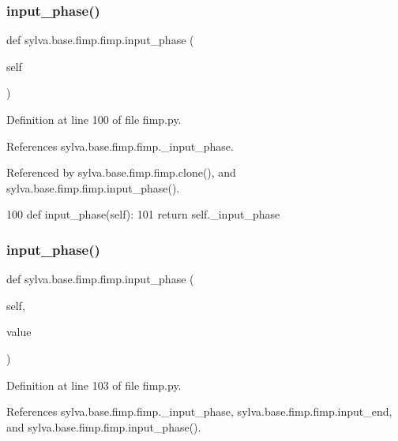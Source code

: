 \subsubsection{\texorpdfstring{input\+\_\+phase()}{input\_phase()}\hspace{0.1cm}{\footnotesize\ttfamily [1/2]}}
{\footnotesize\ttfamily def sylva.\+base.\+fimp.\+fimp.\+input\+\_\+phase (\begin{DoxyParamCaption}\item[{}]{self }\end{DoxyParamCaption})}



Definition at line 100 of file fimp.\+py.



References sylva.\+base.\+fimp.\+fimp.\+\_\+input\+\_\+phase.



Referenced by sylva.\+base.\+fimp.\+fimp.\+clone(), and sylva.\+base.\+fimp.\+fimp.\+input\+\_\+phase().


\begin{DoxyCode}
100     \textcolor{keyword}{def }input\_phase(self):
101         \textcolor{keywordflow}{return} self.\_input\_phase
\end{DoxyCode}
\mbox{\label{classsylva_1_1base_1_1fimp_1_1fimp_a5c9f966e5bc0ac0f2da666d53caae1ac}} 
\subsubsection{\texorpdfstring{input\+\_\+phase()}{input\_phase()}\hspace{0.1cm}{\footnotesize\ttfamily [2/2]}}
{\footnotesize\ttfamily def sylva.\+base.\+fimp.\+fimp.\+input\+\_\+phase (\begin{DoxyParamCaption}\item[{}]{self,  }\item[{}]{value }\end{DoxyParamCaption})}



Definition at line 103 of file fimp.\+py.



References sylva.\+base.\+fimp.\+fimp.\+\_\+input\+\_\+phase, sylva.\+base.\+fimp.\+fimp.\+input\+\_\+end, and sylva.\+base.\+fimp.\+fimp.\+input\+\_\+phase().


